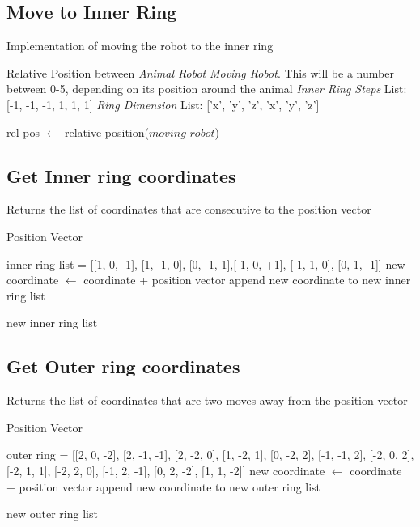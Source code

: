 \subsection{Move to Inner Ring}
\label{function:move to inner ring}
\begin{algorithm}
\caption{Implementation of moving the robot to the inner ring}
 \begin{algorithmic}

\REQUIRE Relative Position between \textit{Animal Robot} \AND \textit{Moving Robot}. This will be a number between 0-5, depending on its position around the animal 
\REQUIRE \textit{Inner Ring Steps} List: [-1, -1, -1, 1, 1, 1]
\REQUIRE \textit{Ring Dimension} List: ['x', 'y', 'z', 'x', 'y', 'z']

\STATE rel pos $\leftarrow$ relative position(\textit{$moving\_robot$})


\end{algorithmic}
\end{algorithm}

\subsection{Get Inner ring coordinates}
\label{function:def_inner_ring}
\begin{algorithm}[H]
\caption{Returns the list of coordinates that are consecutive to the position vector}
\begin{algorithmic}

\REQUIRE Position Vector

inner ring list = [[1, 0, -1], [1, -1, 0], [0, -1, 1],[-1, 0, +1], [-1, 1, 0], [0, 1, -1]]
\STATE new coordinate $\leftarrow$ coordinate + position vector
\STATE append new coordinate to new inner ring list

\ENDFOR
\RETURN new inner ring list


\end{algorithmic}
\end{algorithm}


\subsection{Get Outer ring coordinates}
\label{function:def_outer_ring}
\begin{algorithm}[H]
\caption{Returns the list of coordinates that are two moves away from the position vector}
\begin{algorithmic}

\REQUIRE Position Vector

outer ring = [[2, 0, -2], [2, -1, -1], [2, -2, 0], [1, -2, 1], [0, -2, 2], [-1, -1, 2], [-2, 0, 2], [-2, 1, 1], [-2, 2, 0], [-1, 2, -1], [0, 2, -2], [1, 1, -2]] 
\STATE new coordinate $\leftarrow$ coordinate + position vector
\STATE append new coordinate to new outer ring list

\ENDFOR
\RETURN new outer ring list


\end{algorithmic}
\end{algorithm}

